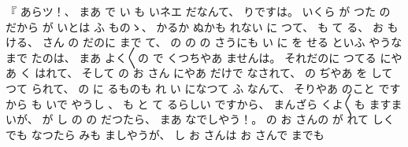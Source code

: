 %
『
あらツ！、
%
まあ
で
い
も
いネエ
だなんて、
%
りですは。
%
いくら
が%
つた
の
だから
が
いとは
ふ
ものゝ、
%
%
かるか
ぬかも
れない
に
つて、
%
も
て
る、
%
お
も
ける、
%
さん
の
だのに
まで
て、
%
の
の
%
の
さうにも
い
に
を
せる
といふ
やうな
まで
たのは、
%
まあ
よく〳〵の
で
くつちやあ
ませんは。
%
それだのに
つてる
にやあ
く
はれて、
%
そして
の
お
さん
にやあ
だけで
なされて、
%
の
ぢやあ
を
して
%
つて
られて、
%
の
に
るものも
れ
い
になつて
ふ
なんて、
%
そりやあ
のこと
ですから
も
いで
やうし
、
%
%
も
と
て
るらしい
ですから、
%
まんざら
くよ〳〵も
ますまいが、
%
が
し
の
の
だつたら、
%
まあ
なでしやう！。
%
の
お
さんの
が
れて
しく
でも
なつたら
みも
ましやうが、
%
し
お
さんは
お
さんで
までも
%
